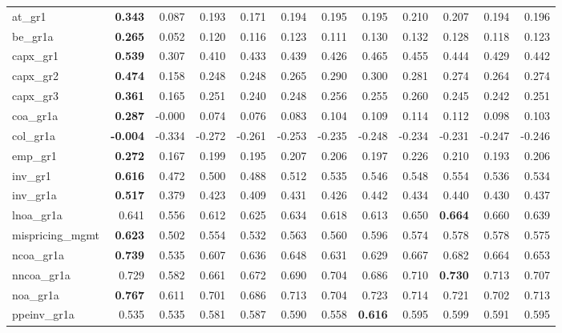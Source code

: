 \begin{landscape}
\begin{longtable}{>{\raggedright\arraybackslash}p{2.6cm}rrrrrrrrrrr}
at\_gr1 & \textbf{0.343} & 0.087 & 0.193 & 0.171 & 0.194 & 0.195 & 0.195 & 0.210 & 0.207 & 0.194 & 0.196 \\
be\_gr1a & \textbf{0.265} & 0.052 & 0.120 & 0.116 & 0.123 & 0.111 & 0.130 & 0.132 & 0.128 & 0.118 & 0.123 \\
capx\_gr1 & \textbf{0.539} & 0.307 & 0.410 & 0.433 & 0.439 & 0.426 & 0.465 & 0.455 & 0.444 & 0.429 & 0.442 \\
capx\_gr2 & \textbf{0.474} & 0.158 & 0.248 & 0.248 & 0.265 & 0.290 & 0.300 & 0.281 & 0.274 & 0.264 & 0.274 \\
capx\_gr3 & \textbf{0.361} & 0.165 & 0.251 & 0.240 & 0.248 & 0.256 & 0.255 & 0.260 & 0.245 & 0.242 & 0.251 \\
coa\_gr1a & \textbf{0.287} & -0.000 & 0.074 & 0.076 & 0.083 & 0.104 & 0.109 & 0.114 & 0.112 & 0.098 & 0.103 \\
col\_gr1a & \textbf{-0.004} & -0.334 & -0.272 & -0.261 & -0.253 & -0.235 & -0.248 & -0.234 & -0.231 & -0.247 & -0.246 \\
emp\_gr1 & \textbf{0.272} & 0.167 & 0.199 & 0.195 & 0.207 & 0.206 & 0.197 & 0.226 & 0.210 & 0.193 & 0.206 \\
inv\_gr1 & \textbf{0.616} & 0.472 & 0.500 & 0.488 & 0.512 & 0.535 & 0.546 & 0.548 & 0.554 & 0.536 & 0.534 \\
inv\_gr1a & \textbf{0.517} & 0.379 & 0.423 & 0.409 & 0.431 & 0.426 & 0.442 & 0.434 & 0.440 & 0.430 & 0.437 \\
lnoa\_gr1a & 0.641 & 0.556 & 0.612 & 0.625 & 0.634 & 0.618 & 0.613 & \cellcolor{blue!10}0.650 & \textbf{\cellcolor{blue!10}0.664} & \cellcolor{blue!10}0.660 & 0.639 \\
mispricing\_mgmt & \textbf{0.623} & 0.502 & 0.554 & 0.532 & 0.563 & 0.560 & 0.596 & 0.574 & 0.578 & 0.578 & 0.575 \\
ncoa\_gr1a & \textbf{0.739} & 0.535 & 0.607 & 0.636 & 0.648 & 0.631 & 0.629 & 0.667 & 0.682 & 0.664 & 0.653 \\
nncoa\_gr1a & 0.729 & 0.582 & 0.661 & 0.672 & 0.690 & 0.704 & 0.686 & 0.710 & \textbf{\cellcolor{blue!10}0.730} & 0.713 & 0.707 \\
noa\_gr1a & \textbf{0.767} & 0.611 & 0.701 & 0.686 & 0.713 & 0.704 & 0.723 & 0.714 & 0.721 & 0.702 & 0.713 \\
ppeinv\_gr1a & 0.535 & 0.535 & \cellcolor{blue!10}0.581 & \cellcolor{blue!10}0.587 & \cellcolor{blue!10}0.590 & \cellcolor{blue!10}0.558 & \textbf{\cellcolor{blue!10}0.616} & \cellcolor{blue!10}0.595 & \cellcolor{blue!10}0.599 & \cellcolor{blue!10}0.591 & \cellcolor{blue!10}0.595 \\

\end{longtable}
\end{landscape}

